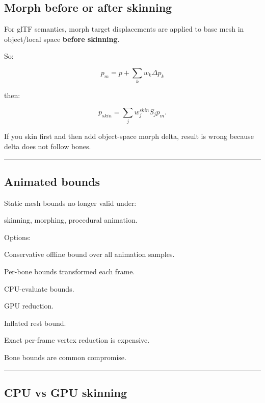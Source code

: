 \subsection{Morph before or after skinning}\label{04-visual-computing-ii-ch041-morph-before-or-after-skinning}

\hypertarget{04-visual-computing-ii-ch041-morph-before-or-after-skinning}{}

For glTF semantics, morph target displacements are applied to base mesh in object/local space \textbf{before skinning}.

So:

\[
\boxed{
p_m=
p+
\sum_kw_k\Delta p_k
}
\]

then:

\[
\boxed{
p_{skin}
=
\sum_j
w_j^{skin}
S_j
p_m.
}
\]

If you skin first and then add object-space morph delta, result is wrong because delta does not follow bones.

\begin{center}\rule{0.5\linewidth}{0.5pt}\end{center}

\subsection{Animated bounds}\label{04-visual-computing-ii-ch041-animated-bounds}

\hypertarget{04-visual-computing-ii-ch041-animated-bounds}{}

Static mesh bounds no longer valid under:

skinning, morphing, procedural animation.

Options:

Conservative offline bound over all animation samples.

Per-bone bounds transformed each frame.

CPU-evaluate bounds.

GPU reduction.

Inflated rest bound.

Exact per-frame vertex reduction is expensive.

Bone bounds are common compromise.

\begin{center}\rule{0.5\linewidth}{0.5pt}\end{center}

\subsection{CPU vs GPU skinning}\label{04-visual-computing-ii-ch041-cpu-vs-gpu-skinning}

